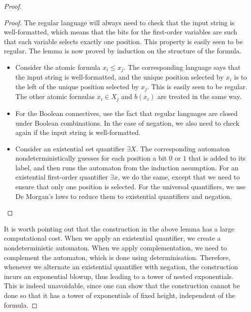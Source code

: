 \begin{proof}
    \begin{proof}
        The regular language will always need to check that the input string is well-formatted, which means that the bits for the first-order variables are such that each variable selects exactly one position. This property is easily seen to be regular. The lemma is now proved by induction on the structure of the formula.
        \begin{itemize}
            \item Consider the atomic formula $x_i \leq x_j$. The corresponding language says that the input string is well-formatted, and the unique position selected by $x_i$ is to the left of the unique position selected by $x_j$. This is easily seen to be regular. The other atomic formulas $x_i \in X_j$ and $b(x_i)$ are treated in the same way. 
            \item For the Boolean connectives, use the fact that regular languages are closed under Boolean combinations. In the case of negation, we also need to check  again if  the input string is well-formatted. 
            \item Consider an existential set quantifier $\exists X$. The corresponding automaton nondeterministically guesses for each position a bit $0$ or $1$ that is added to its label, and then runs the automaton from the induction assumption. For an existential first-order quantifier $\exists x$, we do the same, except that we need to ensure that only one position is selected. For the universal quantifiers, we use De Morgan's laws to reduce them to existential quantifiers and negation.\end{itemize} 
    \end{proof}

    It is worth pointing out that the construction in the above lemma has a large computational cost. When we apply an existential quantifier, we create a nondeterministic automaton. When we apply complementation, we need to complement the automaton, which is done using determinisation. Therefore, whenever we alternate an existential quantifier with negation, the construction incurs an exponential blowup, thus leading to a tower of nested exponentials. This is indeed unavoidable, since one can show that the construction cannot be done so that it has a tower of exponentials of fixed height, independent of the formula.
\end{proof}

